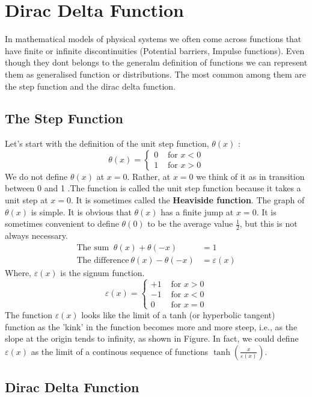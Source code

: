 \chapter{Dirac Delta Function}
In mathematical models of physical systems we often come across functions that have finite or infinite discontinuities (Potential barriers, Impulse functions). Even though they dont belongs to the generalm definition of functions we can represent them as generalised function or distributions. The most common among them are the step function and the dirac delta function.
\section{The Step Function}
Let's start with the definition of the unit step function, $\theta(x)$ :
$$
\theta(x)=\left\{\begin{array}{ll}
0 & \text { for } x<0 \\
1 & \text { for } x>0
\end{array}\right.
$$
We do not define $\theta(x)$ at $x=0$. Rather, at $x=0$ we think of it as in transition between 0 and 1 .The function is called the unit step function because it takes a unit step at $x=0$. It is sometimes called the \textbf{Heaviside function}. The graph of $\theta(x)$ is simple.
It is obvious that $\theta(x)$ has a finite jump at $x=0$. It is sometimes convenient to define $\theta(0)$ to be the average value $\frac{1}{2}$, but this is not always necessary.
\begin{align*}
\text{The sum } \ \theta(x)+\theta(-x)&=1\\
\text{The difference}\ \theta(x)-\theta(-x)&=\varepsilon(x)
\end{align*}
Where, $\varepsilon(x)$ is the signum function.
\begin{equation}
\varepsilon(x)=\left\{\begin{array}{rr}
+1 & \text { for } x>0 \\
-1 & \text { for } x<0 \\
0 & \text { for } x=0
\end{array}\right.
\end{equation} The function $\varepsilon(x)$ looks like the limit of a tanh (or hyperbolic tangent) function as the 'kink' in the function becomes more and more steep, i.e., as the slope at the origin tends to infinity, as shown in Figure. In fact, we could define $\varepsilon(x)$ as the limit of a continous sequence of functions $\tanh(\frac{x}{\varepsilon(x)})$.
\section{Dirac Delta Function}
